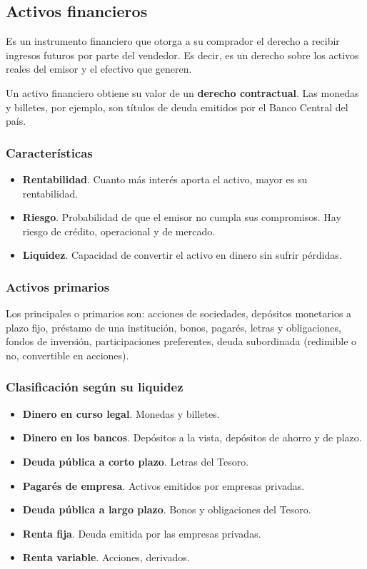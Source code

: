 \documentclass[
10pt, %
a4paper, %
oneside, %
headinclude,footinclude, %
BCOR5mm, %
]{scrartcl}
\newcommand{\n}[1]{\textbf{#1}}
\newcounter{ex}
\begin{document}
	\subsection*{Activos financieros}

		Es un instrumento financiero que otorga a su comprador el derecho a recibir ingresos futuros por parte del vendedor. Es decir, es un derecho sobre los activos reales del emisor y el efectivo que generen. 

		Un activo financiero obtiene su valor de un \n{derecho contractual}. Las monedas y billetes, por ejemplo, son títulos de deuda emitidos por el Banco Central del país.

		\subsubsection*{Características}

			\begin{itemize}
				\item \n{Rentabilidad}. Cuanto más interés aporta el activo, mayor es su rentabilidad.
				\item \n{Riesgo}. Probabilidad de que el emisor no cumpla sus compromisos. Hay riesgo de crédito, operacional y de mercado.
				\item \n{Liquidez}. Capacidad de convertir el activo en dinero sin sufrir pérdidas.
			\end{itemize}

		\subsubsection*{Activos primarios}

			Los principales o primarios son: acciones de sociedades, depósitos monetarios a plazo fijo, préstamo de una institución, bonos, pagarés, letras y obligaciones, fondos de inversión, participaciones preferentes, deuda subordinada (redimible o no, convertible en acciones).

		\subsubsection*{Clasificación según su liquidez}

			\begin{multicols}{2}
			\begin{itemize}
				\item \n{Dinero en curso legal}. Monedas y billetes.
				\item \n{Dinero en los bancos}. Depósitos a la vista, depósitos de ahorro y de plazo.
				\item \n{Deuda pública a corto plazo}. Letras del Tesoro.
				\item \n{Pagarés de empresa}. Activos emitidos por empresas privadas.
				\item \n{Deuda pública a largo plazo}. Bonos y obligaciones del Tesoro.
				\item \n{Renta fija}. Deuda emitida por las empresas privadas.
				\item \n{Renta variable}. Acciones, derivados.
			\end{itemize}
			\end{multicols}
\end{document}
